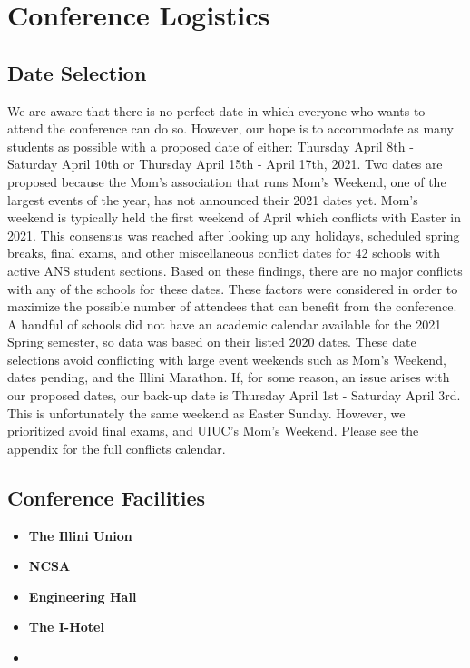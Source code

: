 \documentclass[12pt, letterpaper]{article}
\begin{document}
\newpage
\section{Conference Logistics}

\subsection{Date Selection}
We are aware that there is no perfect date in which everyone who wants to attend the conference can do so. However, our hope is to accommodate as many students as possible with a proposed date of either: Thursday April 8th - Saturday April 10th or Thursday April 15th - April 17th, 2021. Two dates are proposed because the Mom's association that runs Mom's Weekend, one of the largest events of the year, has not announced their 2021 dates yet. Mom's weekend is typically held the first weekend of April which conflicts with Easter in 2021. This consensus was reached after looking up any holidays, scheduled spring breaks, final exams, and other miscellaneous conflict dates for 42 schools with active ANS student sections. Based on these findings, there are no major conflicts with any of the schools for these dates. These factors were considered in order to maximize the possible number of attendees that can benefit from the conference. A handful of schools did not have an academic calendar available for the 2021 Spring semester, so data was based on their listed 2020 dates. These date selections avoid conflicting with large event weekends such as Mom's Weekend, dates pending, and the Illini Marathon. If, for some reason, an issue arises with our proposed dates, our back-up date is Thursday April 1st - Saturday April 3rd. This is unfortunately the same weekend as Easter Sunday. However, we prioritized avoid final exams, and UIUC’s Mom’s Weekend. Please see the appendix for the full conflicts calendar.

\subsection{Conference Facilities}
\begin{itemize}
  \item \textbf{The Illini Union}\\
  \item \textbf{NCSA}
  \item \textbf{Engineering Hall}
  \item \textbf{The I-Hotel}
  \item \textbf{}
\end{itemize}
\end{document}
